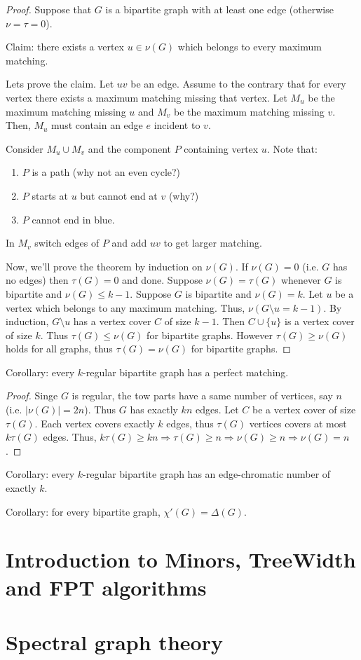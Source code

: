 \documentclass[12pt,a4paper]{article}
\begin{document}
\begin{proof}
  Suppose that \(G\) is a bipartite graph with at least one edge (otherwise
  \(\nu = \tau = 0\)).

  Claim: there exists a vertex \(u \in \nu(G)\) which belongs to every maximum
  matching.

  Lets prove the claim.  Let \(uv\) be an edge.  Assume to the contrary that for
  every vertex there exists a maximum matching missing that vertex.  Let \(M_u\)
  be the maximum matching missing \(u\) and \(M_v\) be the maximum matching
  missing \(v\).  Then, \(M_u\) must contain an edge \(e\) incident to \(v\).

  Consider \(M_u \cup M_v\) and the component \(P\) containing vertex \(u\).
  Note that:
  \begin{enumerate}
  \item \(P\) is a path (why not an even cycle?)
  \item \(P\) starts at \(u\) but cannot end at \(v\) (why?)
  \item \(P\) cannot end in blue.
  \end{enumerate}
  In \(M_v\) switch edges of \(P\) and add \(uv\) to get larger matching.

  Now, we'll prove the theorem by induction on \(\nu(G)\).
  If \(\nu(G)=0\) (i.e. \(G\) has no edges) then \(\tau(G)=0\) and done.
  Suppose \(\nu(G) = \tau(G)\) whenever \(G\) is bipartite and \(\nu(G) \leq k -
  1\).  Suppose \(G\) is bipartite and \(\nu(G) = k\).  Let \(u\) be a vertex
  which belongs to any maximum matching.  Thus, \(\nu(G\setminus u = k - 1)\).
  By induction, \(G\setminus u\) has a vertex cover \(C\) of size \(k - 1\).
  Then \(C \cup \{u\}\) is a vertex cover of size \(k\).  Thus \(\tau(G) \leq
  \nu(G)\) for bipartite graphs.  However \(\tau(G) \geq \nu(G)\) holds for all
  graphs, thus \(\tau(G) = \nu(G)\) for bipartite graphs.
\end{proof}

Corollary: every \(k\)-regular bipartite graph has a perfect matching.
\begin{proof}
  Singe \(G\) is regular, the tow parts have a same number of vertices, say
  \(n\) (i.e. \(|\nu(G)|=2n\)).  Thus \(G\) has exactly \(kn\) edges.  Let \(C\)
  be a vertex cover of size \(\tau(G)\).  Each vertex covers exactly \(k\)
  edges, thus \(\tau(G)\) vertices covers at most \(k \tau(G)\) edges.  Thus,
  \(k \tau(G) \geq k n \Rightarrow \tau(G) \geq n \Rightarrow \nu(G) \geq n
  \Rightarrow \nu(G) = n\).
\end{proof}

Corollary: every \(k\)-regular bipartite graph has an edge-chromatic number of
exactly \(k\).

Corollary: for every bipartite graph, \(\chi'(G) = \Delta(G)\).

\section{Introduction to Minors, TreeWidth and FPT algorithms}
\section{Spectral graph theory}
\end{document}
